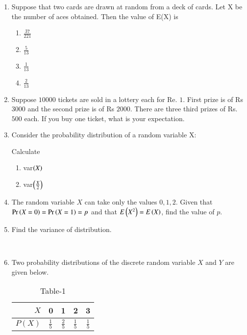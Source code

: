 \begin{enumerate}[label=\thechapter.\arabic*,ref=\thechapter.\theenumi]
\begin{enumerate}
\end{enumerate}

\item Suppose that two cards are drawn at random from a deck of cards. Let X be the
number of aces obtained. Then the value of E(X) is
\begin{enumerate}

\item $\frac{37}{221}$
\item $\frac{5}{13}$
\item $\frac{1}{13}$
\item $\frac{2}{13}$

\end{enumerate}

\item Suppose $10000$ tickets are sold in a lottery each for Re. $1$. First prize is of Rs $3000$ and the second prize is of Rs $2000$. There are three third prizes of Rs. $500$ each. If you buy one ticket, what is your expectation.

\item Consider the probability distribution of a random variable X:
\begin{table}[H]
        \centering
        
        \label{tab:exemplar/12/13/3/24}
    \end{table}
Calculate
\begin{enumerate}[label=(\roman*)]
\item var$\left(X\right)$
\item var$\left(\frac{X}{2}\right)$
\end{enumerate}
\solution

\item The random variable $X$ can take only the values $0,1,2$. Given that $\Pr\left(X=0\right)=\Pr\left(X=1\right)=p$ and that $E\left(X^2\right) = E\left(X\right)$, find the value of $p$.
\\

\item Find the variance of distribution.
\begin{table}[!ht]
	
\end{table}\\

\item Two probability distributions of the discrete random variable $X$ and $Y$ are given below.\\
\begin{table}[h!]
\begin{minipage}{0.45\linewidth}
 \begin{center}
  \caption{Table-1}
  \label{tab:ncert/12/13/3/30/}
\begin{tabular}{|r|l|c|l|c|}
\hline
$X$ & 0 & 1 & 2 & 3\\
\hline
$P(X)$ & $\frac{1}{5}$ & $\frac{2}{5}$ & $\frac{1}{5}$ & $\frac{1}{5}$ \\
\hline
\end{tabular}
\end{center}
\end{minipage}
\end{table}


\end{enumerate}
